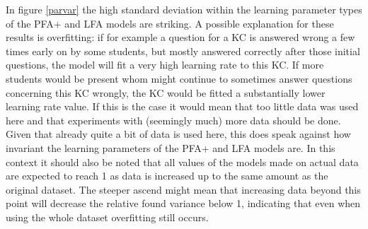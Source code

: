\documentclass{scrartcl}
\begin{document}
In figure \ref{parvar} the high standard deviation within the learning parameter types of the PFA+ and LFA models are striking. A possible explanation for these results is overfitting: if for example a question for a KC is answered wrong a few times early on by some students, but mostly answered correctly after those initial questions, the model will fit a very high learning rate to this KC. If more students would be present whom might continue to sometimes answer questions concerning this KC wrongly, the KC would be fitted a substantially lower learning rate value. If this is the case it would mean that too little data was used here and that experiments with (seemingly much) more data should be done. Given that already quite a bit of data is used here, this does speak against how invariant the learning parameters of the PFA+ and LFA models are. In this context it should also be noted that all values of the models made on actual data are expected to reach 1 as data is increased up to the same amount as the original dataset. The steeper ascend might mean that increasing data beyond this point will decrease the relative found variance below 1, indicating that even when using the whole dataset overfitting still occurs.
\end{document}
